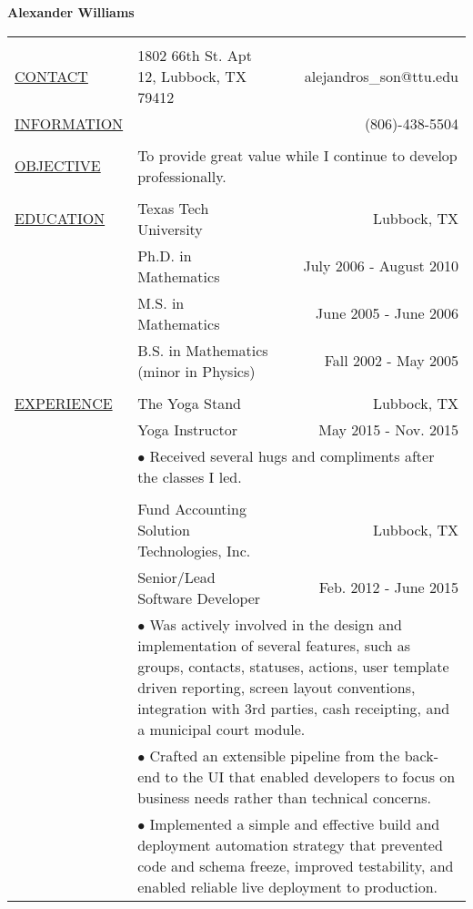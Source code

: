 \documentclass[11pt,oneside,letterpaper,titlepage,fleqn]{article}
\begin{document}
\noindent\LARGE{\textbf{Alexander Williams}}\normalsize{}\\
\hspace{-1em}\begin{tabular}[h]{@{}p{3.25cm}@{}lr}
\hline\\
\underline{CONTACT} & 1802 66th St. Apt 12, Lubbock, TX 79412 & alejandros\_son@ttu.edu \\
\underline{INFORMATION} &  & (806)-438-5504\\
\\
\underline{OBJECTIVE} &  \multicolumn{2}{p{14cm}}{To provide great value while I continue to develop professionally.}\\
\\
\underline{EDUCATION} & Texas Tech University & Lubbock, TX\\
           & Ph.D. in Mathematics & July 2006 - August 2010\\            
           & M.S. in Mathematics  & June 2005 - June 2006\\                       
           & B.S. in Mathematics (minor in Physics) & Fall 2002 - May 2005\\
\\
\underline{EXPERIENCE} & The Yoga Stand & Lubbock, TX\\
           & Yoga Instructor & May 2015 - Nov. 2015\\
           & \multicolumn{2}{p{14cm}}{$\bullet$ Received several hugs and compliments after the classes I led.}\\
\\					
& Fund Accounting Solution Technologies, Inc. & Lubbock, TX\\
           & Senior/Lead Software Developer & Feb. 2012 - June 2015\\
           & \multicolumn{2}{p{14cm}}{$\bullet$ Was actively involved in the design and implementation of several features, such as groups,
 contacts, statuses, actions, user template driven reporting, screen layout conventions,
integration with 3rd parties, cash receipting, and a municipal court module.}\\
           & \multicolumn{2}{p{14cm}}{$\bullet$ Crafted an extensible pipeline from the back-end to the UI that enabled developers to
 focus on business needs rather than technical concerns.}\\
           & \multicolumn{2}{p{14cm}}{$\bullet$ Implemented a simple and effective build and deployment automation strategy that prevented
 code and schema freeze, improved testability, and enabled reliable live deployment to production.}\\

\end{tabular}
\end{document}

